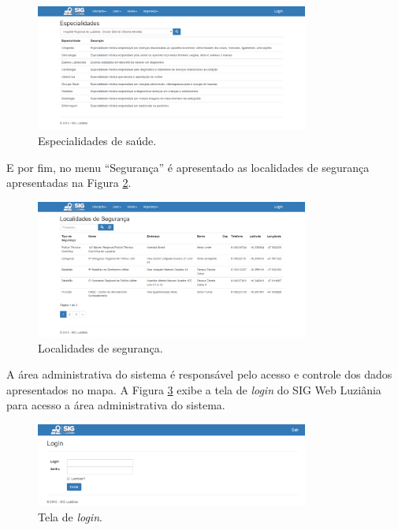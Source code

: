 \newpage

\begin{figure}[h]
\centering
\includegraphics[width=0.80\textwidth]{./img/cap_IV/15-Especialidades}
\caption{Especialidades de saúde.}
\label{fig:Especialidade}
\end{figure}

\newpage

E por fim, no menu “Segurança” é apresentado as localidades de segurança apresentadas na Figura \ref{fig:Seguranca}.

\begin{figure}[h]
\centering
\includegraphics[width=0.80\textwidth]{./img/cap_IV/16-Seguranca}
\caption{Localidades de segurança.}
\label{fig:Seguranca}
\end{figure}

A área administrativa do sistema é responsável pelo acesso e controle dos dados apresentados no mapa. A Figura \ref{fig:Login} exibe a tela de \textit{login} do SIG Web Luziânia para acesso a área administrativa do sistema.

\begin{figure}[h]
\centering
\includegraphics[width=0.80\textwidth]{./img/cap_IV/17-Login}
\caption{Tela de \textit{login}.}
\label{fig:Login}
\end{figure}


